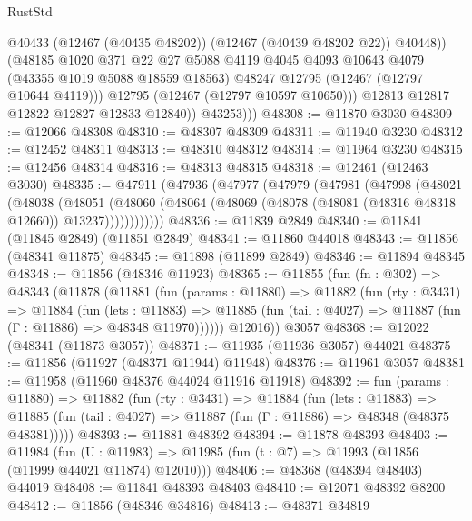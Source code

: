 \begin{lexlean}{RustStd}
\begin{coremodule}
                    @40433
                    (@12467 (@40435 @48202))
                    (@12467 (@40439 @48202 @22))
                    @40448))
                (@48185
                  @1020
                  @371
                  @22
                  @27
                  @5088
                  @4119
                  @4045
                  @4093
                  @10643
                  @4079
                  (@43355 @1019 @5088 @18559 @18563)
                  @48247
                  @12795
                  (@12467 (@12797 @10644 @4119)))
                @12795
                (@12467 (@12797 @10597 @10650)))
              @12813
              @12817
              @12822
              @12827
              @12833
              @12840))
          @43253)))
@48308 := @11870 @3030
@48309 := @12066 @48308
@48310 := @48307 @48309
@48311 := @11940 @3230
@48312 := @12452 @48311
@48313 := @48310 @48312
@48314 := @11964 @3230
@48315 := @12456 @48314
@48316 := @48313 @48315
@48318 := @12461 (@12463 @3030)
@48335 := @47911
    (@47936
      (@47977
        (@47979
          (@47981
            (@47998
              (@48021
                (@48038
                  (@48051
                    (@48060
                      (@48064 (@48069 (@48078 (@48081 (@48316 @48318 @12660)) @13237))))))))))))
@48336 := @11839 @2849
@48340 := @11841 (@11845 @2849) (@11851 @2849)
@48341 := @11860 @44018
@48343 := @11856 (@48341 @11875)
@48345 := @11898 (@11899 @2849)
@48346 := @11894 @48345
@48348 := @11856 (@48346 @11923)
@48365 := @11855
    (fun (fn : @302) =>
    @48343
      (@11878
        (@11881
          (fun (params : @11880) =>
          @11882
            (fun (rty : @3431) =>
            @11884
              (fun (lets : @11883) =>
              @11885 (fun (tail : @4027) => @11887 (fun (Γ : @11886) => @48348 @11970))))))
        @12016))
    @3057
@48368 := @12022 (@48341 (@11873 @3057))
@48371 := @11935 (@11936 @3057) @44021
@48375 := @11856 (@11927 (@48371 @11944) @11948)
@48376 := @11961 @3057
@48381 := @11958 (@11960 @48376 @44024 @11916 @11918)
@48392 := fun (params : @11880) =>
  @11882
    (fun (rty : @3431) =>
    @11884
      (fun (lets : @11883) =>
      @11885 (fun (tail : @4027) => @11887 (fun (Γ : @11886) => @48348 (@48375 @48381)))))
@48393 := @11881 @48392
@48394 := @11878 @48393
@48403 := @11984
    (fun (U : @11983) => @11985 (fun (t : @7) => @11993 (@11856 (@11999 @44021 @11874) @12010)))
@48406 := @48368 (@48394 @48403) @44019
@48408 := @11841 @48393 @48403
@48410 := @12071 @48392 @8200
@48412 := @11856 (@48346 @34816)
@48413 := @48371 @34819

\end{coremodule}
\end{lexlean}
